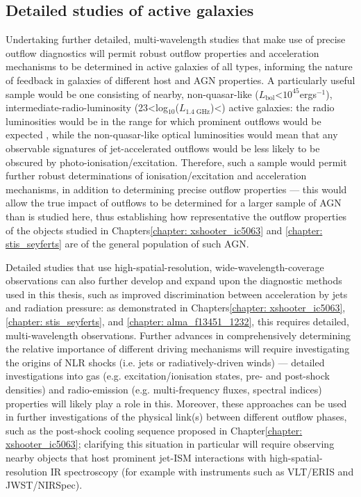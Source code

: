 \subsection{Detailed studies of active galaxies}
\label{section: conclusions_and_future_work: future_work: detailed_studies}

Undertaking further detailed, multi-wavelength studies that make use of precise outflow diagnostics will permit robust outflow properties and acceleration mechanisms to be determined in active galaxies of all types, informing the nature of feedback in galaxies of different host and AGN properties. A particularly useful sample would be one consisting of nearby, non-quasar-like ($L_\mathrm{bol}$\;\textless\;$10^{45}$\;erg\;s$^{-1}$), intermediate-radio-luminosity (23\;\textless\;log$_\mathrm{10}$($L_\mathrm{1.4\;GHz}$\;[W\;Hz$^{-1}$])\;\textless{}) active galaxies: the radio luminosities would be in the range for which prominent outflows would be expected \citep{Whittle1988, Mullaney2013}, while the non-quasar-like optical luminosities would mean that any observable signatures of jet-accelerated outflows would be less likely to be obscured by photo-ionisation/excitation. Therefore, such a sample would permit further robust determinations of ionisation/excitation and acceleration mechanisms, in addition to determining precise outflow properties --- this would allow the true impact of outflows to be determined for a larger sample of AGN than is studied here, thus establishing how representative the outflow properties of the objects studied in Chapters\;\ref{chapter: xshooter_ic5063} and \ref{chapter: stis_seyferts} are of the general population of such AGN.

Detailed studies that use high-spatial-resolution, wide-wavelength-coverage observations can also further develop and expand upon the diagnostic methods used in this thesis, such as improved discrimination between acceleration by jets and radiation pressure: as demonstrated in Chapters\;\ref{chapter: xshooter_ic5063}, \ref{chapter: stis_seyferts}, and \ref{chapter: alma_f13451_1232}, this requires detailed, multi-wavelength observations. Further advances in comprehensively determining the relative importance of different driving mechanisms will require investigating the origins of NLR shocks (i.e. jets or radiatively-driven winds) --- detailed investigations into gas (e.g. excitation/ionisation states, pre- and post-shock densities) and radio-emission (e.g. multi-frequency fluxes, spectral indices) properties will likely play a role in this. Moreover, these approaches can be used in further investigations of the physical link(s) between different outflow phases, such as the post-shock cooling sequence proposed in Chapter\;\ref{chapter: xshooter_ic5063}; clarifying this situation in particular will require observing nearby objects that host prominent jet-ISM interactions with high-spatial-resolution IR spectroscopy (for example with instruments such as VLT/ERIS and JWST/NIRSpec).

